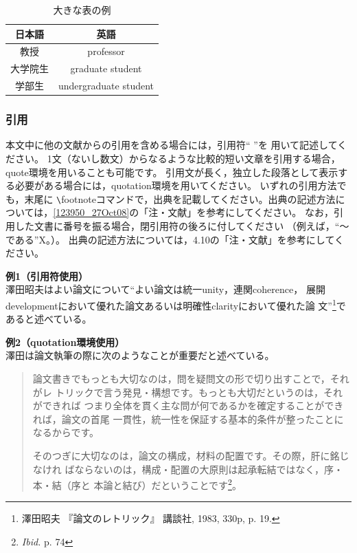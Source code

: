\documentclass[b5paper,10pt,twocolumn,tombow]{jarticle}
\begin{document}
\begin{table}[ht!]
\begin{center}
\begin{tabular}{cc} \hline
日本語 &英語 \\ \hline
教授 & professor \\
大学院生 & graduate student \\
学部生 & undergraduate student \\ \hline
\end{tabular}
 \caption{大きな表の例}
\end{center}
\end{table}


\subsubsection{引用}
本文中に他の文献からの引用を含める場合には，引用符`` ''を
用いて記述してください。
1文（ないし数文）からなるような比較的短い文章を引用する場合，quote環境を用いることも可能です。
引用文が長く，独立した段落として表示する必要がある場合には，quotation環境を用いてください。
いずれの引用方法でも，末尾に
\verb|\|footnoteコマンドで，出典を記載してください。出典の記述方法に
ついては，\ref{123950_27Oct08}の「注・文献」を参考にしてください。
なお，引用した文書に番号を振る場合，閉引用符の後ろに付してください
（例えば，``～である''X。）。
出典の記述方法については，4.10の「注・文献」を参考にしてください。

\noindent{}\textbf{例1（引用符使用）}\\
澤田昭夫はよい論文について``よい論文は統一unity，連関coherence，
展開developmentにおいて優れた論文あるいは明確性clarityにおいて優れた論
文''\footnote{澤田昭夫 『論文のレトリック』 講談社, 1983, 330p, p. 19.}であると述べている。

\noindent{}\textbf{例2（quotation環境使用）}\\
澤田は論文執筆の際に次のようなことが重要だと述べている。
\begin{quotation}
論文書きでもっとも大切なのは，問を疑問文の形で切り出すことで，それがレ
 トリックで言う発見・構想です。もっとも大切だというのは，それができれば
 つまり全体を貫く主な問が何であるかを確定することができれば，論文の首尾
 一貫性，統一性を保証する基本的条件が整ったことになるからです。

そのつぎに大切なのは，論文の構成，材料の配置です。その際，肝に銘じなけれ
 ばならないのは，構成・配置の大原則は起承転結ではなく，序・本・結（序と
 本論と結び）だということです\footnote{\textit{Ibid.} p. 74}。
\end{quotation}
\end{document}
